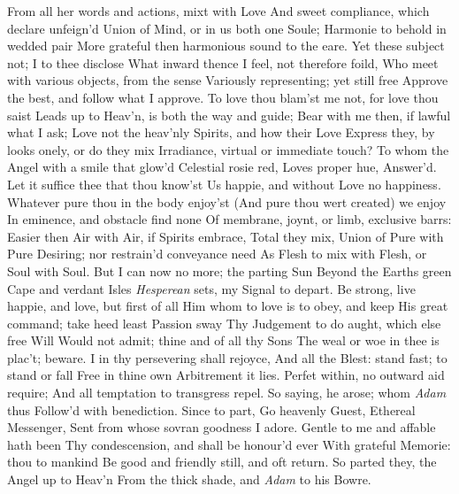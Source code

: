 \documentclass[11pt]{book}
\newcounter {first}
\begin{document}
From all her words and actions, mixt with Love 
And sweet compliance, which declare unfeign'd 
Union of Mind, or in us both one Soule; 
Harmonie to behold in wedded pair 
More grateful then harmonious sound to the eare. 
Yet these subject not; I to thee disclose 
What inward thence I feel, not therefore foild, 
Who meet with various objects, from the sense 
Variously representing; yet still free 
Approve the best, and follow what I approve. 
To love thou blam'st me not, for love thou saist 
Leads up to Heav'n, is both the way and guide; 
Bear with me then, if lawful what I ask; 
Love not the heav'nly Spirits, and how their Love 
Express they, by looks onely, or do they mix 
Irradiance, virtual or immediate touch? 
\quad To whom the Angel with a smile that glow'd 
Celestial rosie red, Loves proper hue, 
Answer'd.  Let it suffice thee that thou know'st 
Us happie, and without Love no happiness. 
Whatever pure thou in the body enjoy'st 
(And pure thou wert created) we enjoy 
In eminence, and obstacle find none 
Of membrane, joynt, or limb, exclusive barrs: 
Easier then Air with Air, if Spirits embrace, 
Total they mix, Union of Pure with Pure 
Desiring; nor restrain'd conveyance need 
As Flesh to mix with Flesh, or Soul with Soul. 
But I can now no more; the parting Sun 
Beyond the Earths green Cape and verdant Isles 
\textit{Hesperean} sets, my Signal to depart. 
Be strong, live happie, and love, but first of all 
Him whom to love is to obey, and keep 
His great command; take heed least Passion sway 
Thy Judgement to do aught, which else free Will 
Would not admit; thine and of all thy Sons 
The weal or woe in thee is plac't; beware. 
I in thy persevering shall rejoyce, 
And all the Blest: stand fast; to stand or fall 
Free in thine own Arbitrement it lies. 
Perfet within, no outward aid require; 
And all temptation to transgress repel. 
\quad So saying, he arose; whom \textit{Adam} thus 
Follow'd with benediction.  Since to part, 
Go heavenly Guest, Ethereal Messenger, 
Sent from whose sovran goodness I adore. 
Gentle to me and affable hath been 
Thy condescension, and shall be honour'd ever 
With grateful Memorie: thou to mankind 
Be good and friendly still, and oft return. 
\quad So parted they, the Angel up to Heav'n 
From the thick shade, and \textit{Adam} to his Bowre. 


\Book
 
\end{document}
